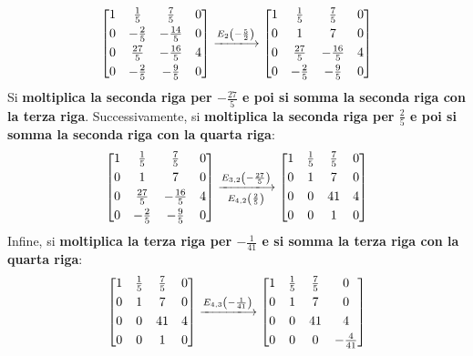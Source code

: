 \documentclass[a4paper]{article}
\makeatletter
\newenvironment{rowequmatbra}[1]{\left[\array{@{}#1@{}}}{\endarray\right]}
\makeatother
\begin{document}
	\begin{equation*}
		\begin{rowequmatbra}{cccc}
			1	&  \frac{1}{5}	& \frac{7}{5}	& 0 \\ [0.3em]
			0 	&  -\frac{2}{5}	& -\frac{14}{5}	& 0 \\ [0.3em]
			0	&  \frac{27}{5}	& -\frac{16}{5}	& 4 \\ [0.3em]
			0	&  -\frac{2}{5}	& -\frac{9}{5}	& 0
		\end{rowequmatbra} \xlongrightarrow{E_{2}\left(-\frac{5}{2}\right)}
		\begin{rowequmatbra}{cccc}
			1	&  \frac{1}{5}	& \frac{7}{5}	& 0 \\ [0.3em]
			0 	&  1			& 7				& 0 \\ [0.3em]
			0	&  \frac{27}{5}	& -\frac{16}{5}	& 4 \\ [0.3em]
			0	&  -\frac{2}{5}	& -\frac{9}{5}	& 0
		\end{rowequmatbra}
	\end{equation*}
	Si \textbf{moltiplica la seconda riga per $-\frac{27}{5}$ e poi si somma la seconda riga con la terza riga}. Successivamente, si \textbf{moltiplica la seconda riga per $\frac{2}{5}$ e poi si somma la seconda riga con la quarta riga}:
	\begin{equation*}
		\begin{rowequmatbra}{cccc}
			1	&  \frac{1}{5}	& \frac{7}{5}	& 0 \\ [0.3em]
			0 	&  1			& 7				& 0 \\ [0.3em]
			0	&  \frac{27}{5}	& -\frac{16}{5}	& 4 \\ [0.3em]
			0	&  -\frac{2}{5}	& -\frac{9}{5}	& 0
		\end{rowequmatbra} \xlongrightarrow[E_{4,2}\left(\frac{2}{5}\right)]{E_{3,2}\left(-\frac{27}{5}\right)}
		\begin{rowequmatbra}{cccc}
			1	&  \frac{1}{5}	& \frac{7}{5}	& 0 \\ [0.3em]
			0 	&  1			& 7				& 0 \\ [0.3em]
			0	&  0			& 41			& 4 \\ [0.3em]
			0	&  0			& 1				& 0
		\end{rowequmatbra}
	\end{equation*}
	Infine, si \textbf{moltiplica la terza riga per $-\frac{1}{41}$ e si somma la terza riga con la quarta riga}:
	\begin{equation*}
		\begin{rowequmatbra}{cccc}
			1	&  \frac{1}{5}	& \frac{7}{5}	& 0 \\ [0.3em]
			0 	&  1			& 7				& 0 \\ [0.3em]
			0	&  0			& 41			& 4 \\ [0.3em]
			0	&  0			& 1				& 0
		\end{rowequmatbra} \xlongrightarrow{E_{4,3}\left(-\frac{1}{41}\right)}
		\begin{rowequmatbra}{cccc}
			1	&  \frac{1}{5}	& \frac{7}{5}	& 0 \\ [0.3em]
			0 	&  1			& 7				& 0 \\ [0.3em]
			0	&  0			& 41			& 4 \\ [0.3em]
			0	&  0			& 0				& -\frac{4}{41}
		\end{rowequmatbra}
	\end{equation*}
\end{document}
